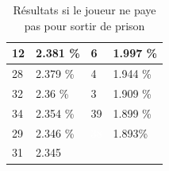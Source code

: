\documentclass[letterpaper]{article}
\begin{document}
\begin{table}[h]
\begin{tabular}{|l|l||l|l|}
	  \cellcolor[HTML]{FF69B4} 12 & 2.381 \%  & \cellcolor[HTML]{E6E6FA}  6 & 1.997 \% \\ \hline
	  \cellcolor[HTML]{FFD700} 28 & 2.379 \%  & \cellcolor[HTML]{A0522D}  4 & 1.944 \% \\ \hline
	  \cellcolor[HTML]{2E8B57} 32 & 2.36 \%   & \cellcolor[HTML]{EEEED1}  3 & 1.909 \% \\ \hline
	  \cellcolor[HTML]{EEEED1} 34 & 2.354 \%  & \cellcolor[HTML]{8B1A1A} 39 & 1.899 \% \\ \hline
	  \cellcolor[HTML]{FFFFF0} 29 & 2.346 \%  & \cellcolor[HTML]{483D8B} \textcolor{white}{38} & 1.893\%  \\ \hline
	  \cellcolor[HTML]{BEBEBE} 31 & 2.345 \\ \cline{1-2}
	\end{tabular}
	\caption{Résultats si le joueur ne paye pas pour sortir de prison}
	\label{result_paye_pas}
      \end{table}
\end{document}
